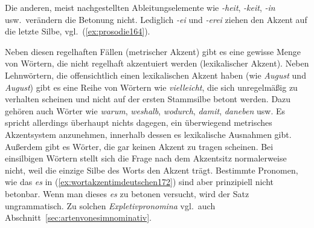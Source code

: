 
Die anderen, meist nachgestellten Ableitungselemente wie \textit{-heit}, \textit{-keit}, \textit{-in} usw.\ verändern die Betonung nicht.
Lediglich \textit{-ei} und \textit{-erei} ziehen den Akzent auf die letzte Silbe, vgl.\ (\ref{ex:prosodie164}).

Neben diesen regelhaften Fällen (metrischer Akzent) gibt es eine gewisse Menge von Wörtern, die nicht regelhaft akzentuiert werden (lexikalischer Akzent).
Neben Lehnwörtern, die offensichtlich einen lexikalischen Akzent haben (wie \textit{\Akz August} und \textit{Au\Akz gust}) gibt es eine Reihe von Wörtern wie \textit{vie\Akz lleicht}, die sich unregelmäßig zu verhalten scheinen und nicht auf der ersten Stammsilbe betont werden.
Dazu gehören auch Wörter wie \textit{wa\Akz rum}, \textit{wes\Akz halb}, \textit{wo\Akz durch}, \textit{da\Akz mit}, \textit{da\Akz neben} usw.
Es spricht allerdings überhaupt nichts dagegen, ein überwiegend metrisches Akzentsystem anzunehmen, innerhalb dessen es lexikalische Ausnahmen gibt.
Außerdem gibt es Wörter, die gar keinen Akzent zu tragen scheinen.
Bei einsilbigen Wörtern stellt sich die Frage nach dem Akzentsitz normalerweise nicht, weil die einzige Silbe des Worts den Akzent trägt.
Bestimmte Pronomen, wie das \textit{es} in (\ref{ex:wortakzentimdeutschen172}) sind aber prinzipiell nicht betonbar.
Wenn man dieses \textit{es} zu betonen versucht, wird der Satz ungrammatisch.
Zu solchen \textit{Expletivpronomina} vgl.\ auch Abschnitt~\ref{sec:artenvonesimnominativ}.\label{abs:wortakzentimdeutschen171}

\begin{exe}
  \ex\label{ex:wortakzentimdeutschen172}
  \begin{xlist}
  \end{xlist}
\end{exe}

